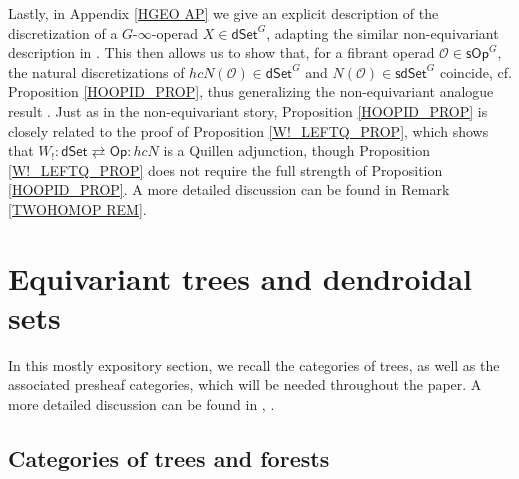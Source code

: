 \documentclass[a4paper,10pt
,draft
]{article}%
\numberwithin{equation}{section}
\numberwithin{figure}{section}
\theoremstyle{definition} %
\renewcommand{\O}{\ensuremath{\mathcal O}}
\newcommand{\1}{\ensuremath{\mathbbm 1}}%
\begin{document}
Lastly, in Appendix \ref{HGEO AP}
we give an explicit description of the discretization of
a $G$-$\infty$-operad $X \in \mathsf{dSet}^G$,
adapting the similar non-equivariant description
in \cite[\S 6]{MW09}.
This then allows us to
show that,
for a fibrant operad
$\O \in \mathsf{sOp}^G$,
the natural discretizations of
$hcN(\O) \in \mathsf{dSet}^G$
and
$N(\O) \in \mathsf{sdSet}^G$
coincide, 
cf. Proposition \ref{HOOPID_PROP},
thus generalizing the non-equivariant analogue result
\cite[Prop. 4.8]{CM13b}.
Just as in the non-equivariant story,
Proposition \ref{HOOPID_PROP} is closely related
to the proof of 
Proposition \ref{W!_LEFTQ_PROP},
which shows that 
$W_! 
\colon 
\mathsf{dSet} 
\rightleftarrows 
\mathsf{Op}
\colon 
hcN$
is a Quillen adjunction,
though Proposition \ref{W!_LEFTQ_PROP}
does not require the full strength of 
Proposition \ref{HOOPID_PROP}.
A more detailed discussion can be found in 
Remark \ref{TWOHOMOP REM}.






\section{Equivariant trees and dendroidal sets}
\label{EQTRDS SEC}

In this mostly expository section, 
we recall the categories of trees,
as well as the associated presheaf categories,
which will be needed throughout the paper.
A more detailed discussion can be found in \cite{Per18}, \cite{BP_edss}.


\subsection{Categories of trees and forests}
\label{FORESTS_SEC}
\end{document}
